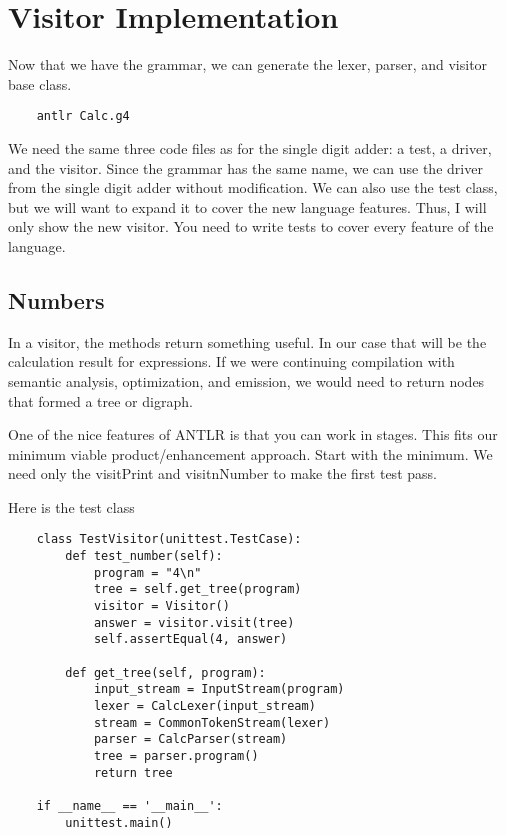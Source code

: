 \section{Visitor Implementation}

Now that we have the grammar, we can generate the lexer, parser, and
visitor base class.

{\footnotesize
\begin{verbatim}
    antlr Calc.g4
\end{verbatim}
}

We need the same three code files as for the single digit adder:
a test, a driver, and the visitor. Since the grammar has the same name,
we can use the driver from the single digit adder without modification.
We can also use the test class, but we will want to expand it to cover
the new language features. Thus, I will only show the new visitor.
You need to write tests to cover every feature of the language.

\subsection{Numbers}

In a visitor, the methods return something useful. In our case that
will be the calculation result for expressions. If we were continuing
compilation with semantic analysis, optimization, and emission, we would
need to return nodes that formed a tree or digraph.

One of the nice features of ANTLR is that you can work in stages.
This fits our minimum viable product/enhancement approach. Start with
the minimum. We need only the visitPrint and visitnNumber to make
the first test pass.

Here is the test class

{\footnotesize
\begin{verbatim}
    class TestVisitor(unittest.TestCase):
        def test_number(self):
            program = "4\n"
            tree = self.get_tree(program)
            visitor = Visitor()
            answer = visitor.visit(tree)
            self.assertEqual(4, answer)

        def get_tree(self, program):
            input_stream = InputStream(program)
            lexer = CalcLexer(input_stream)
            stream = CommonTokenStream(lexer)
            parser = CalcParser(stream)
            tree = parser.program()
            return tree

    if __name__ == '__main__':
        unittest.main()
\end{verbatim}
}

